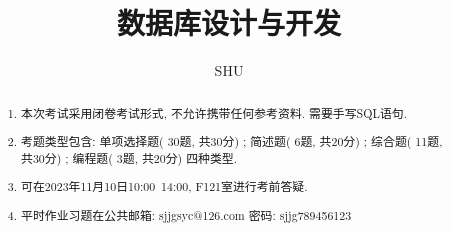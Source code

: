 \documentclass{article}                     %
\numberwithin{equation}{section}            %
\numberwithin{figure}{section}              %
\numberwithin{table}{section}               %
\begin{document}
\title{数据库设计与开发}%
\author{SHU}



\maketitle%
\newpage
\begin{abstract}%
    \begin{enumerate}
        \item 本次考试采用闭卷考试形式, 不允许携带任何参考资料. 需要手写SQL语句. \\
        \item 考题类型包含: 单项选择题( 30题, 共30分) ; 简述题( 6题, 共20分) ; 综合题( 11题, 共30分) ; 编程题( 3题, 共20分) 四种类型. \\
        \item 可在2023年11月10日10:00~14:00, F121室进行考前答疑. \\
        \item 平时作业习题在公共邮箱: sjjgsyc@126.com 密码: sjjg789456123
    \end{enumerate}
\end{abstract}
\end{document}
